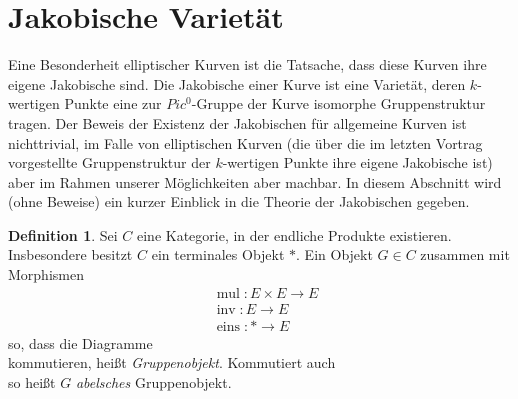 \documentclass{amsart}
\theoremstyle{plain}
\theoremstyle{definition}
\newtheorem{definition}[subsection]{Definition}
\begin{document}
%
%

\section{Jakobische Varietät}
\label{section-jakobische-varietaet}

Eine Besonderheit elliptischer Kurven ist die Tatsache, dass diese Kurven ihre eigene Jakobische sind.
Die Jakobische einer Kurve ist eine Varietät, deren $k$-wertigen Punkte eine zur $Pic^0$-Gruppe der Kurve isomorphe Gruppenstruktur tragen.
Der Beweis der Existenz der Jakobischen für allgemeine Kurven ist nichttrivial, im Falle von elliptischen Kurven (die über die im letzten Vortrag vorgestellte Gruppenstruktur der $k$-wertigen Punkte ihre eigene Jakobische ist) aber im Rahmen unserer Möglichkeiten aber machbar.
In diesem Abschnitt wird (ohne Beweise) ein kurzer Einblick in die Theorie der Jakobischen gegeben.

\begin{definition}
	\label{def-gruppenobjekt}
	Sei $C$ eine Kategorie, in der endliche Produkte existieren. Insbesondere besitzt $C$ ein terminales Objekt $*$.
	Ein Objekt $G \in C$ zusammen mit Morphismen
	\begin{align*}
		& \operatorname{mul} \colon E \times E \rightarrow E \\
		& \operatorname{inv} \colon E \rightarrow E \\
		& \operatorname{eins} \colon * \rightarrow E
	\end{align*}
	so, dass die Diagramme
	\begin{equation*}
	\end{equation*}
	kommutieren, heißt {\it Gruppenobjekt}.
	Kommutiert auch
	\begin{equation*}
	\end{equation*}
	so heißt $G$ {\it abelsches} Gruppenobjekt.
\end{definition}
\end{document}
